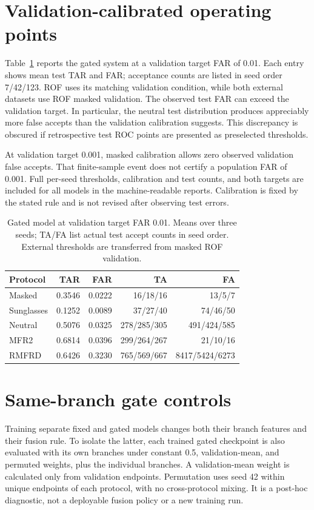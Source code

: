 \documentclass[12pt,a4paper,oneside]{report}
\begin{document}
\section{Validation-calibrated operating points}
Table~\ref{tab:calibration} reports the gated system at a validation target FAR of 0.01. Each entry shows mean test TAR and FAR; acceptance counts are listed in seed order 7/42/123. ROF uses its matching validation condition, while both external datasets use ROF masked validation. The observed test FAR can exceed the validation target. In particular, the neutral test distribution produces appreciably more false accepts than the validation calibration suggests. This discrepancy is obscured if retrospective test ROC points are presented as preselected thresholds.

At validation target 0.001, masked calibration allows zero observed validation false accepts. That finite-sample event does not certify a population FAR of 0.001. Full per-seed thresholds, calibration and test counts, and both targets are included for all models in the machine-readable reports. Calibration is fixed by the stated rule and is not revised after observing test errors.
\begin{table}[t]
\centering
\caption{Gated model at validation target FAR 0.01. Means over three seeds; TA/FA list actual test accept counts in seed order. External thresholds are transferred from masked ROF validation.}
\label{tab:calibration}
\begin{tabular}{lrrrr}
\toprule
Protocol & TAR & FAR & TA & FA\\
\midrule
Masked & 0.3546 & 0.0222 & 16/18/16 & 13/5/7\\
Sunglasses & 0.1252 & 0.0089 & 37/27/40 & 74/46/50\\
Neutral & 0.5076 & 0.0325 & 278/285/305 & 491/424/585\\
MFR2 & 0.6814 & 0.0396 & 299/264/267 & 21/10/16\\
RMFRD & 0.6426 & 0.3230 & 765/569/667 & 8417/5424/6273\\
\bottomrule
\end{tabular}
\end{table}

\section{Same-branch gate controls}
Training separate fixed and gated models changes both their branch features and their fusion rule. To isolate the latter, each trained gated checkpoint is also evaluated with its own branches under constant 0.5, validation-mean, and permuted weights, plus the individual branches. A validation-mean weight is calculated only from validation endpoints. Permutation uses seed 42 within unique endpoints of each protocol, with no cross-protocol mixing. It is a post-hoc diagnostic, not a deployable fusion policy or a new training run.
\end{document}
